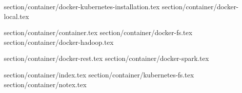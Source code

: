 

%








%


section/container/docker-kubernetes-installation.tex
section/container/docker-local.tex

section/container/container.tex
section/container/docker-fs.tex
section/container/docker-hadoop.tex

section/container/docker-rest.tex
section/container/docker-spark.tex

section/container/index.tex
section/container/kubernetes-fs.tex
section/container/notex.tex